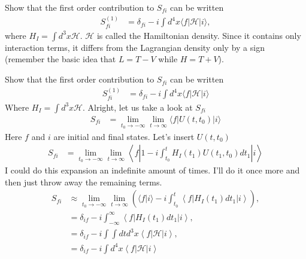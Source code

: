 \documentclass[working, oneside]{../../Preambles/tuftebook}
\begin{document}
\begin{exercise}[5]
Show that the first order contribution to \( S_{fi} \) can be written
\begin{align*}
S_{fi}^{(1)}
&= \delta_{fi} - i \int d^4x \langle f | \mathcal{H} | i \rangle, \tag{53}
\end{align*}
where \( H_I = \int d^3x \mathcal{H} \). \( \mathcal{H} \) is called the Hamiltonian density. Since it contains only interaction terms, it differs from the Lagrangian density only by a sign (remember the basic idea that \( L = T - V \) while \( H = T + V \)).

\end{exercise}

\begin{solution}
Show that the first order contribution to \( S_{fi} \) can be written
\begin{align*}
S_{fi}^{(1)}
&= \delta_{fi} - i \int d^4x \langle f | \mathcal{H} | i \rangle
\end{align*}
Where \( H_I = \int d^3x \mathcal{H} \). Alright, let us take a look at \( S_{fi} \)
\begin{align*}
S_{fi}
&= \lim_{t_0 \rightarrow -\infty} \lim_{t \rightarrow \infty} \langle f | U(t, t_0) | i \rangle
\end{align*}
Here \( f \) and \( i \) are initial and final states. Let's insert \( U(t, t_0) \)
\begin{align*}
S_{fi}
&= \lim_{t_0 \rightarrow -\infty} \lim_{t \rightarrow \infty} \left\langle f \left| 1 - i \int_{t_0}^t H_I(t_1) U(t_1, t_0) dt_1 \right| i \right\rangle
\end{align*}
I could do this expansion an indefinite amount of times. I'll do it once more and then just throw away the remaining terms.
\begin{align*}
S_{fi}
&\approx \lim_{t_0 \rightarrow -\infty} \lim_{t \rightarrow \infty} \left( \langle f | i \rangle - i \int_{t_0}^t \left<f \right| H_I(t_1) dt_1 \left|i \right>\right), \\
&= \delta_{if} - i \int_{-\infty}^\infty \left<f \right|H_I(t_1) dt_1\left|i \right>, \\
&= \delta_{if} - i \int \int  dt d^3x \left<f \right|\mathcal{H}\left|i \right>, \\
&= \delta_{if} - i \int d^4x\left<f \right| \mathcal{H}\left|i \right>
\end{align*}
\end{solution}
\end{document}

